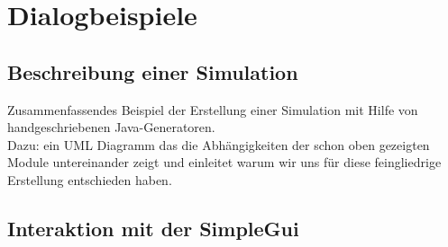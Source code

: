 \chapter{Dialogbeispiele}\label{chapter:dialogs}
\section{Beschreibung einer Simulation}\label{sec:sim_description}
Zusammenfassendes Beispiel der Erstellung einer Simulation mit Hilfe von handgeschriebenen Java-Generatoren.\\
Dazu: ein UML Diagramm das die Abhängigkeiten der schon oben gezeigten Module untereinander zeigt und einleitet warum wir uns für diese feingliedrige Erstellung entschieden haben.\\
\section{Interaktion mit der SimpleGui}\label{sec:dialog_simplegui}





%


